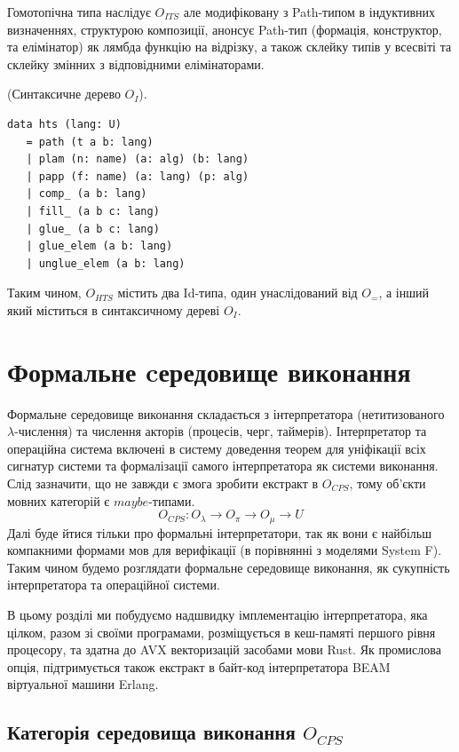 Гомотопічна типа наслідує $O_{ITS}$ але модифіковану з
Path-типом в індуктивних визначеннях, структурою композиції,
анонсує Path-тип (формація, конструктор, та елімінатор)
як лямбда функцію на відрізку, а також склейку типів у всесвіті
та склейку змінних з відповідними елімінаторами.

\begin{definition} (Синтаксичне дерево $O_I$).
\begin{lstlisting}
data hts (lang: U)
   = path (t a b: lang)
   | plam (n: name) (a: alg) (b: lang)
   | papp (f: name) (a: lang) (p: alg)
   | comp_ (a b: lang)
   | fill_ (a b c: lang)
   | glue_ (a b c: lang)
   | glue_elem (a b: lang)
   | unglue_elem (a b: lang)
\end{lstlisting}
\end{definition}

Таким чином,
$O_{HTS}$ містить два Id-типа, один унаслідований від $O_=$,
а інший який міститься в синтаксичному дереві $O_I$.

\section{Формальне cередовище виконання}
Формальне середовище виконання складається з інтерпретатора
(нетитизованого $\lambda$-числення) та числення акторів (процесів, черг, таймерів).
Інтерпретатор та операційна система включені в систему доведення теорем
для уніфікації всіх сигнатур системи та формалізації самого інтерпретатора
як системи виконання. Слід зазначити, що не
завжди є змога зробити екстракт в $O_{CPS}$, тому об'єкти мовних
категорій є $maybe$-типами.
$$
O_{CPS}: O_\lambda \rightarrow O_\pi \rightarrow O_\mu \rightarrow U
$$
Далі буде йтися тільки про формальні інтерпретатори,
так як вони є найбільш компакними формами мов для
верифікації (в порівнянні з моделями System F).
Таким чином будемо розглядати формальне середовище виконання, як
сукупність інтерпретатора та операційної системи.

В цьому розділі ми побудуємо надшвидку імплементацію інтерпретатора,
яка цілком, разом зі своїми програмами, розміщується в кеш-памяті
першого рівня процесору, та здатна до AVX векторизацій засобами мови Rust.
Як промислова опція, підтримується також екстракт
в байт-код інтерпретатора BEAM віртуальної машини Erlang.

\subsection{Категорія середовища виконання $O_{CPS}$}

